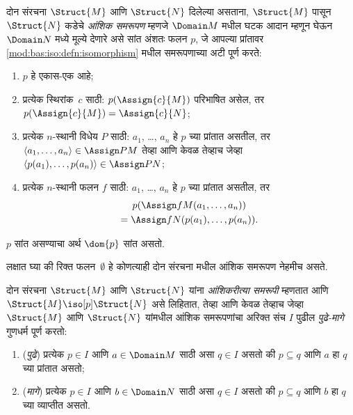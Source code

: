 \begin{defn}
  दोन संरचना $\Struct{M}$ आणि $\Struct{N}$ दिलेल्या असताना,
  $\Struct{M}$ पासून $\Struct{N}$ कडेचे \emph{आंशिक समरूपण} म्हणजे
  $\Domain M$ मधील घटक आदान म्हणून घेऊन $\Domain N$ मध्ये मूल्ये देणारे
  असे सांत अंशतः फलन $p$, जे आपल्या प्रांतावर
  \ref{mod:bas:iso:defn:isomorphism} मधील समरूपणाच्या अटी पूर्ण करते:
  \begin{enumerate}
  \item $p$ हे एकास-एक आहे;
  \item प्रत्येक स्थिरांक~$c$ साठी: $p(\Assign{c}{M})$ परिभाषित
    असेल, तर $p(\Assign{c}{M}) = \Assign{c}{N}$;
  \item प्रत्येक $n$-स्थानी विधेय $P$ साठी: $a_1$, \dots, $a_n$
    हे $p$ च्या प्रांतात असतील, तर $\langle a_1, \dots, a_n\rangle \in
    \Assign P M$ तेव्हा आणि केवळ तेव्हाच जेव्हा $\langle p(a_1), \dots, p(a_n) \rangle
    \in \Assign P N$;
  \item प्रत्येक $n$-स्थानी फलन $f$ साठी: $a_1$, \dots, $a_n$
    हे $p$ च्या प्रांतात असतील, तर
    \begin{multline*}
    p(\Assign f M (a_1, \dots,a_n))\\
    = \Assign f N (p(a_1), \dots, p(a_n)).
    \end{multline*}
  \end{enumerate}
  $p$ सांत असण्याचा अर्थ $\dom{p}$ सांत असतो.
\end{defn}

लक्षात घ्या की रिक्त फलन~$\emptyset$ हे कोणत्याही दोन संरचना
मधील आंशिक समरूपण नेहमीच असते.

\begin{defn}\label{mod:bas:pis:defn:partialisom}
  दोन संरचना $\Struct{M}$ आणि $\Struct{N}$ यांना
  \emph{आंशिकरीत्या समरूपी} म्हणतात आणि $\Struct{M} \iso[p]
  \Struct{N}$ असे लिहितात, तेव्हा आणि केवळ तेव्हाच जेव्हा
  $\Struct{M}$ आणि $\Struct{N}$ यांमधील आंशिक समरूपणांचा अरिक्त संच $I$
  पुढील \emph{पुढे-मागे} गुणधर्म पूर्ण करतो:
  \begin{enumerate}
  \item (\emph{पुढे}) प्रत्येक $p \in I$ आणि $a \in \Domain M$ साठी असा
    $q \in I$ असतो की $p \subseteq q$ आणि $a$ हा $q$ च्या प्रांतात
    असतो;
  \item (\emph{मागे}) प्रत्येक $p \in I$ आणि $b \in \Domain N$ साठी असा
    $q \in I$ असतो की $p \subseteq q$ आणि $b$ हा $q$ च्या व्याप्तीत
    असतो.
  \end{enumerate}
\end{defn}

